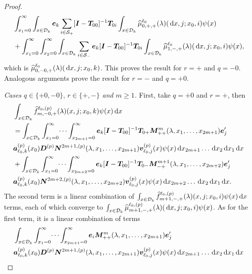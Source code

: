 \begin{proof}
	\begin{align}
		&\int_{x_1=0}^\infty \int_{x\in\mathcal{D}_k} \boldsymbol e_k \sum_{i\in\mathcal{S}_+} [\boldsymbol I - \boldsymbol T_{00}]^{-1}\boldsymbol T_{0i}\int_{x\in\mathcal{D}_k}\widehat{\mu}_{0,+,+}^{\ell_0}(\lambda)(\, \mathrm{d} x,j;x_0,i) \psi(x) \nonumber
		\\& + \int_{x_1=0}^\infty\int_{x_2=0}^\infty \int_{x\in\mathcal{D}_k} \sum_{i\in\mathcal{S}_-}\boldsymbol e_k [\boldsymbol I - \boldsymbol T_{00}]^{-1}\boldsymbol T_{0i}\int_{x\in\mathcal{D}_k}\widehat{\mu}_{1,-,+}^{\ell_0}(\lambda)(\, \mathrm{d} x,j;x_0,i) \psi(x), \label{eqn: thm 1223B}
	\end{align}
	which is \(\widehat{\mu}_{0,-0,+}^{\ell_0}(\lambda)(\, \mathrm{d} x,j;x_0,k)\). This proves the result for \(r=+\) and \(q=-0\). Analogous arguments prove the result for \(r=-\) and \(q=+0\).

	\textit{Cases \(q\in\{+0,-0\},\,r \in \{+,-\}\) and \(m\geq 1\).} First, take \(q=+0\) and \(r=+\), then 
	\begin{align}
		&\int_{x\in\mathcal{D}_k}\widehat{f}_{m,-0,+}^{\ell_0,(p)}(\lambda)(x,j;x_0,k)\psi(x)\, \mathrm{d} x \nonumber 
		\\&=\int_{x\in\mathcal{D}_k}\int_{x_1=0}^\infty \dots \int_{x_{2m+1}=0}^\infty   \boldsymbol e_k [\boldsymbol I - \boldsymbol T_{00}]^{-1}\boldsymbol T_{0+}\boldsymbol M^m_{++}(\lambda,x_1,\dots,x_{2m+1})\boldsymbol e_j'{} \nonumber
		\\& \boldsymbol a_{\ell_0,k}^{(p)}(x_0) \boldsymbol D^{(p)} \boldsymbol N^{2m+1,(p)}(\lambda,x_1,\dots,x_{2m+1}) {\boldsymbol v}_{\ell_0,j}^{(p)}(x)\psi(x)\, \mathrm{d} x_{2m+1}\dots\, \mathrm{d} x_2 \, \mathrm{d} x_1  \, \mathrm{d} x\nonumber
		\\& + \int_{x\in\mathcal{D}_k}\int_{x_1=0}^\infty \dots \int_{x_{2m+2}=0}^\infty   \boldsymbol e_k [\boldsymbol I - \boldsymbol T_{00}]^{-1}\boldsymbol T_{0-}\boldsymbol M^{m+1}_{-+}(\lambda,x_1,\dots,x_{2m+2})\boldsymbol e_j'{} \nonumber
		\\& \boldsymbol a_{\ell_0,k}^{(p)}(x_0)\boldsymbol N^{2m+2,(p)}(\lambda,x_1,\dots,x_{2m+2}) {\boldsymbol v}_{\ell_0,j}^{(p)}(x)\psi(x)\, \mathrm{d} x_{2m+2}\dots\, \mathrm{d} x_2 \, \mathrm{d} x_1 \, \mathrm{d} x.
	\end{align}
	The second term is a linear combination of \(\int_{x\in\mathcal{D}_k}\widehat{f}_{m+1,-,+}^{\ell_0,(p)}(\lambda)(x,j;x_0,i) \psi(x)\, \mathrm{d} x\) terms, each of which converge to \(\int_{x\in\mathcal{D}_k}\widehat{\mu}_{m+1,-,+}^{\ell_0,(p)}(\lambda)(\, \mathrm{d} x,j;x_0,i) \psi(x)\).
	As for the first term, it is a linear combination of terms 
	\begin{align*}
		&\int_{x\in\calD_k}\int_{x_1=0}^\infty \dots \int_{x_{2m+1}=0}^\infty \bs e_i \bs M^m_{++}(\lambda,x_1,\dots,x_{2m+1})\bs e_j\tr{} \nonumber
		\\& \bs a_{\ell_0,k}^{(p)}(x_0)\bs D^{(p)}\bs N^{2m+1,(p)}(\lambda,x_1,\dots,x_{2m+1}) {\bs v}_{\ell_0,j}^{(p)}(x)\psi(x)\wrt x_{2m+1}\dots\wrt x_2 \wrt x_1 \wrt x

\end{align*}
\end{proof}
